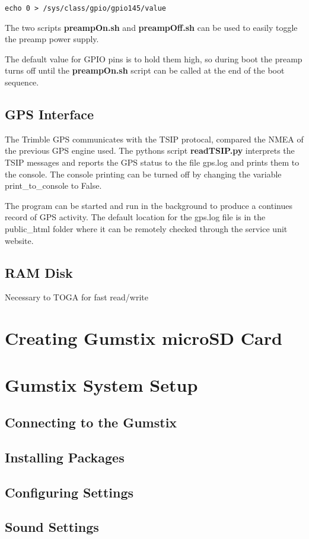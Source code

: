 \begin{verbatim}
echo 0 > /sys/class/gpio/gpio145/value
\end{verbatim}

The two scripts {\bf preampOn.sh} and {\bf preampOff.sh} can be used to easily toggle the preamp power supply.

The default value for GPIO pins is to hold them high, so during boot the preamp turns off until the {\bf preampOn.sh} script can be called at the end of the boot sequence.

\subsection{GPS Interface}

The Trimble GPS communicates with the TSIP protocal, compared the NMEA of the previous GPS engine used.
The pythons script {\bf readTSIP.py} interprets the TSIP messages and reports the GPS status to the file gps.log and prints them to the console.
The console printing can be turned off by changing the variable print\_to\_console to False.

The program can be started and run in the background to produce a continues record of GPS activity.
The default location for the gps.log file is in the public\_html folder where it can be remotely checked through the service unit website.

\subsection{RAM Disk}

Necessary to TOGA for fast read/write

\section{Creating Gumstix microSD Card}

%

\section{Gumstix System Setup}

\subsection{Connecting to the Gumstix}

\subsection{Installing Packages}

%

\subsection{Configuring Settings}

%

\subsection{Sound Settings}
